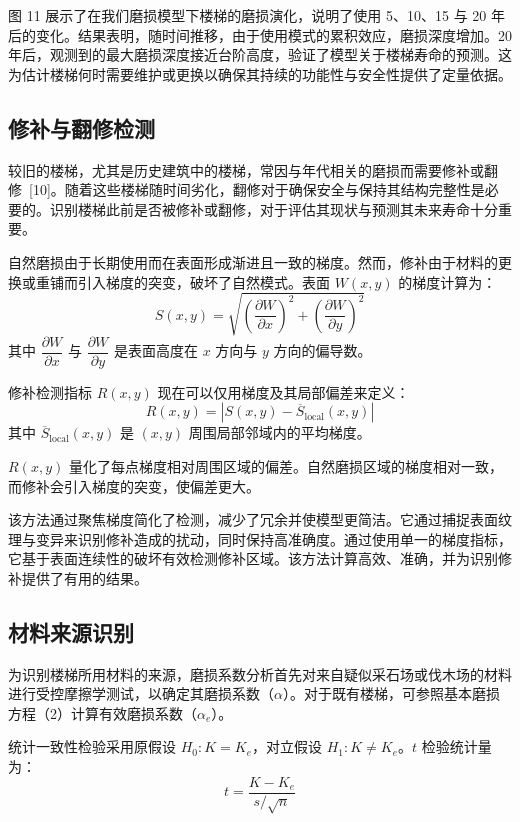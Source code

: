 \documentclass[11pt,a4paper]{ctexart}
\begin{document}
图 11 展示了在我们磨损模型下楼梯的磨损演化，说明了使用 5、10、15 与 20 年后的变化。结果表明，随时间推移，由于使用模式的累积效应，磨损深度增加。20 年后，观测到的最大磨损深度接近台阶高度，验证了模型关于楼梯寿命的预测。这为估计楼梯何时需要维护或更换以确保其持续的功能性与安全性提供了定量依据。

\subsection{修补与翻修检测}

较旧的楼梯，尤其是历史建筑中的楼梯，常因与年代相关的磨损而需要修补或翻修~[10]。随着这些楼梯随时间劣化，翻修对于确保安全与保持其结构完整性是必要的。识别楼梯此前是否被修补或翻修，对于评估其现状与预测其未来寿命十分重要。

自然磨损由于长期使用而在表面形成渐进且一致的梯度。然而，修补由于材料的更换或重铺而引入梯度的突变，破坏了自然模式。表面 $W(x,y)$ 的梯度计算为：
\begin{equation}
S(x,y) = \sqrt{\left(\frac{\partial W}{\partial x}\right)^{2} + \left(\frac{\partial W}{\partial y}\right)^{2}}
\end{equation}
其中 $\dfrac{\partial W}{\partial x}$ 与 $\dfrac{\partial W}{\partial y}$ 是表面高度在 $x$ 方向与 $y$ 方向的偏导数。

修补检测指标 $R(x,y)$ 现在可以仅用梯度及其局部偏差来定义：
\begin{equation}
R(x,y) = \left|S(x,y) - \overline{S}_{\mathrm{local}}(x,y)\right|
\end{equation}
其中 $\overline{S}_{\mathrm{local}}(x,y)$ 是 $(x,y)$ 周围局部邻域内的平均梯度。

$R(x,y)$ 量化了每点梯度相对周围区域的偏差。自然磨损区域的梯度相对一致，而修补会引入梯度的突变，使偏差更大。

该方法通过聚焦梯度简化了检测，减少了冗余并使模型更简洁。它通过捕捉表面纹理与变异来识别修补造成的扰动，同时保持高准确度。通过使用单一的梯度指标，它基于表面连续性的破坏有效检测修补区域。该方法计算高效、准确，并为识别修补提供了有用的结果。

\subsection{材料来源识别}

为识别楼梯所用材料的来源，磨损系数分析首先对来自疑似采石场或伐木场的材料进行受控摩擦学测试，以确定其磨损系数（$\alpha$）。对于既有楼梯，可参照基本磨损方程（2）计算有效磨损系数（$\alpha_e$）。

统计一致性检验采用原假设 $H_0: K = K_e$，对立假设 $H_1: K\neq K_e$。$t$ 检验统计量为：
\begin{equation}
t = \frac{K-K_e}{s/\sqrt{n}}
\end{equation}
\end{document}
